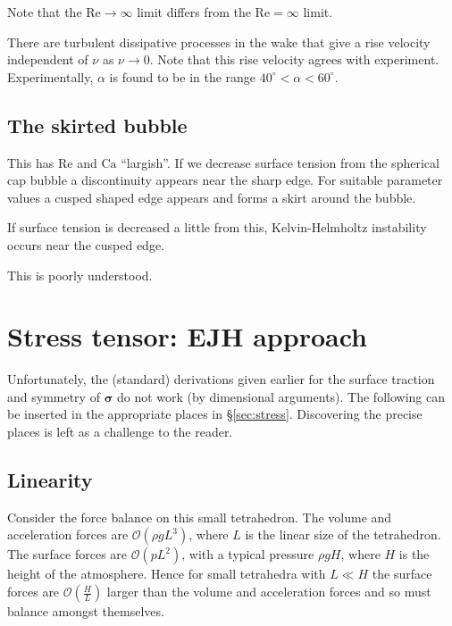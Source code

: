 \documentclass{notes}
\newcommand{\cO}{\mathcal{O}}
\newcommand{\Rey}{\mathrm{Re}}
\newcommand{\Ca}{\mathrm{Ca}}
\newcommand{\bs}{\boldsymbol{\sigma}}
\theoremstyle{plain}
\begin{document}
Note that the $\Rey \to \infty$ limit differs from the $\Rey = \infty$
limit.

There are turbulent dissipative processes in the wake that give a
rise velocity independent of $\nu$ as $\nu \to 0$.  Note that this
rise velocity agrees with experiment.  Experimentally,
$\alpha$ is found to be in the range $40^\circ < \alpha < 60^\circ$.

\section{The skirted bubble}

This has $\Rey$ and $\Ca$ ``largish''.  If we decrease surface tension
from the spherical cap bubble a discontinuity appears near the sharp edge.
For suitable parameter values a cusped shaped edge appears and forms a
skirt around the bubble.

\vspace{1.5in}

If surface tension is decreased a little from this, Kelvin-Helmholtz
instability occurs near the cusped edge.

\vspace{1.5in}

This is poorly understood.

\backmatter

\appendix

\chapter{Stress tensor: EJH approach}

Unfortunately, the (standard) derivations given earlier for the
surface traction and symmetry of $\bs$ do not work (by dimensional
arguments).  The following can be inserted in the appropriate places
in \S\ref{sec:stress}.  Discovering the precise places is left as a
challenge to the reader.

\section*{Linearity}

Consider the force balance on this small tetrahedron.  The volume
and acceleration forces are $\cO(\rho g L^3)$, where $L$ is the linear 
size of the tetrahedron.  The surface forces are $\cO(p L^2)$, with a
typical pressure $\rho g H$, where $H$ is the height of the
atmosphere.  Hence for small tetrahedra with $L \ll H$ the surface
forces are $\cO(\tfrac{H}{L})$ larger than the volume and acceleration 
forces and so must balance amongst themselves.
\end{document}
